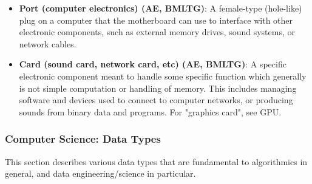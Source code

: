 \documentclass{article}
\begin{document}
\begin{itemize}
	\item \textbf{Port (computer electronics) (AE, BMLTG)}: A female-type (hole-like) plug on a computer that the motherboard can use to interface with other electronic components, such as external memory drives, sound systems, or network cables.

	\item \textbf{Card (sound card, network card, etc) (AE, BMLTG)}: A specific electronic component meant to handle some specific function which generally is not simple computation or handling of memory. This includes managing software and devices used to connect to computer networks, or producing sounds from binary data and programs. For "graphics card", see GPU.

\end{itemize}



\subsubsection*{Computer Science: Data Types}

This section describes various data types that are fundamental to algorithmics in general, and data engineering/science in particular.
\end{document}
